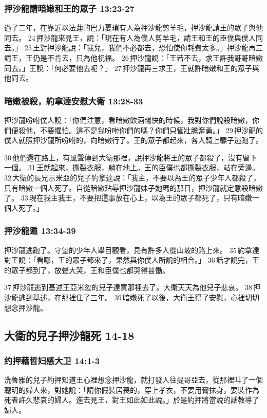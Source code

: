 \subsubsection{押沙龍請暗嫩和王的眾子 13:23-27}
過了二年，在靠近以法蓮的巴力夏瑣有人為押沙龍剪羊毛，押沙龍請王的眾子與他同去。 24 押沙龍來見王，說：「現在有人為僕人剪羊毛，請王和王的臣僕與僕人同去。」 25 王對押沙龍說：「我兒，我們不必都去，恐怕使你耗費太多。」押沙龍再三請王，王仍是不肯去，只為他祝福。 26 押沙龍說：「王若不去，求王許我哥哥暗嫩同去。」王說：「何必要他去呢？」 27 押沙龍再三求王，王就許暗嫩和王的眾子與他同去。

\subsubsection{暗嫩被殺，約拿達安慰大衛 13:28-33}
押沙龍吩咐僕人說：「你們注意，看暗嫩飲酒暢快的時候，我對你們說殺暗嫩，你們便殺他，不要懼怕。這不是我吩咐你們的嗎？你們只管壯膽奮勇。」 29 押沙龍的僕人就照押沙龍所吩咐的，向暗嫩行了。王的眾子都起來，各人騎上騾子逃跑了。

30 他們還在路上，有風聲傳到大衛那裡，說押沙龍將王的眾子都殺了，沒有留下一個。 31 王就起來，撕裂衣服，躺在地上。王的臣僕也都撕裂衣服，站在旁邊。 32 大衛的長兄示米亞的兒子約拿達說：「我主，不要以為王的眾子少年人都殺了，只有暗嫩一個人死了。自從暗嫩玷辱押沙龍妹子她瑪的那日，押沙龍就定意殺暗嫩了。 33 現在我主我王，不要把這事放在心上，以為王的眾子都死了，只有暗嫩一個人死了。」

\subsubsection{押沙龍遁 13:34-39}
押沙龍逃跑了。守望的少年人舉目觀看，見有許多人從山坡的路上來。 35 約拿達對王說：「看哪，王的眾子都來了，果然與你僕人所說的相合。」 36 話才說完，王的眾子都到了，放聲大哭，王和臣僕也都哭得甚慟。

37 押沙龍逃到基述王亞米忽的兒子達買那裡去了。大衛天天為他兒子悲哀。 38 押沙龍逃到基述，在那裡住了三年。 39 暗嫩死了以後，大衛王得了安慰，心裡切切想念押沙龍。

\subsection{大衛的兒子押沙龍死 14-18}
\subsubsection{约押藉哲妇感大卫 14:1-3}
洗魯雅的兒子約押知道王心裡想念押沙龍，就打發人往提哥亞去，從那裡叫了一個聰明的婦人來，對她說：「請你假裝居喪的，穿上孝衣，不要用膏抹身，要裝作為死者許久悲哀的婦人。進去見王，對王如此如此說。」於是約押將當說的話教導了婦人。

